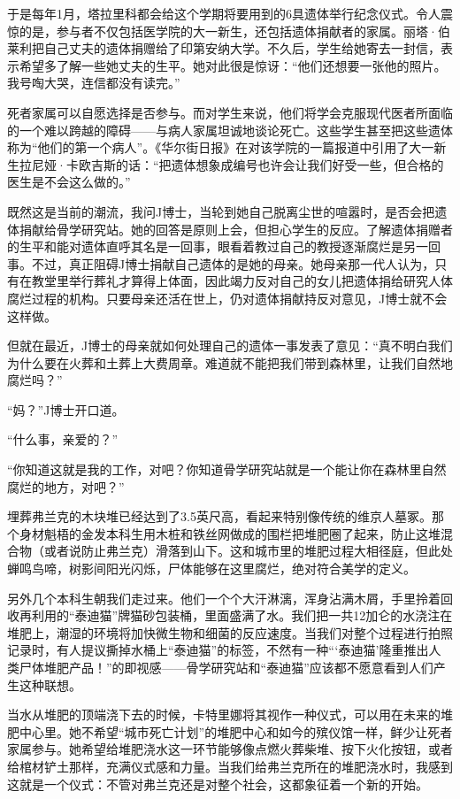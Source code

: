 \documentclass[12pt,oneside]{book}
\begin{document}
\begin{bookref}[frametitle={\cite{好好告别}}]
于是每年1月，塔拉里科都会给这个学期将要用到的6具遗体举行纪念仪式。令人震惊的是，参与者不仅包括医学院的大一新生，还包括遗体捐献者的家属。丽塔·伯莱利把自己丈夫的遗体捐赠给了印第安纳大学。不久后，学生给她寄去一封信，表示希望多了解一些她丈夫的生平。她对此很是惊讶：“他们还想要一张他的照片。我号啕大哭，连信都没有读完。”

死者家属可以自愿选择是否参与。而对学生来说，他们将学会克服现代医者所面临的一个难以跨越的障碍——与病人家属坦诚地谈论死亡。这些学生甚至把这些遗体称为“他们的第一个病人”。《华尔街日报》在对该学院的一篇报道中引用了大一新生拉尼娅·卡欧吉斯的话：“把遗体想象成编号也许会让我们好受一些，但合格的医生是不会这么做的。”

既然这是当前的潮流，我问J博士，当轮到她自己脱离尘世的喧嚣时，是否会把遗体捐献给骨学研究站。她的回答是原则上会，但担心学生的反应。了解遗体捐赠者的生平和能对遗体直呼其名是一回事，眼看着教过自己的教授逐渐腐烂是另一回事。不过，真正阻碍J博士捐献自己遗体的是她的母亲。她母亲那一代人认为，只有在教堂里举行葬礼才算得上体面，因此竭力反对自己的女儿把遗体捐给研究人体腐烂过程的机构。只要母亲还活在世上，仍对遗体捐献持反对意见，J博士就不会这样做。

但就在最近，J博士的母亲就如何处理自己的遗体一事发表了意见：“真不明白我们为什么要在火葬和土葬上大费周章。难道就不能把我们带到森林里，让我们自然地腐烂吗？”

“妈？”J博士开口道。

“什么事，亲爱的？”

“你知道这就是我的工作，对吧？你知道骨学研究站就是一个能让你在森林里自然腐烂的地方，对吧？”

埋葬弗兰克的木块堆已经达到了3.5英尺高，看起来特别像传统的维京人墓冢。那个身材魁梧的金发本科生用木桩和铁丝网做成的围栏把堆肥圈了起来，防止这堆混合物（或者说防止弗兰克）滑落到山下。这和城市里的堆肥过程大相径庭，但此处蝉鸣鸟啼，树影间阳光闪烁，尸体能够在这里腐烂，绝对符合美学的定义。

另外几个本科生朝我们走过来。他们一个个大汗淋漓，浑身沾满木屑，手里拎着回收再利用的“泰迪猫”牌猫砂包装桶，里面盛满了水。我们把一共12加仑的水浇注在堆肥上，潮湿的环境将加快微生物和细菌的反应速度。当我们对整个过程进行拍照记录时，有人提议撕掉水桶上“泰迪猫”的标签，不然有一种“‘泰迪猫’隆重推出人类尸体堆肥产品！”的即视感——骨学研究站和“泰迪猫”应该都不愿意看到人们产生这种联想。

当水从堆肥的顶端浇下去的时候，卡特里娜将其视作一种仪式，可以用在未来的堆肥中心里。她不希望“城市死亡计划”的堆肥中心和如今的殡仪馆一样，鲜少让死者家属参与。她希望给堆肥浇水这一环节能够像点燃火葬柴堆、按下火化按钮，或者给棺材铲土那样，充满仪式感和力量。当我们给弗兰克所在的堆肥浇水时，我感到这就是一个仪式：不管对弗兰克还是对整个社会，这都象征着一个新的开始。


\end{bookref}
\end{document}
